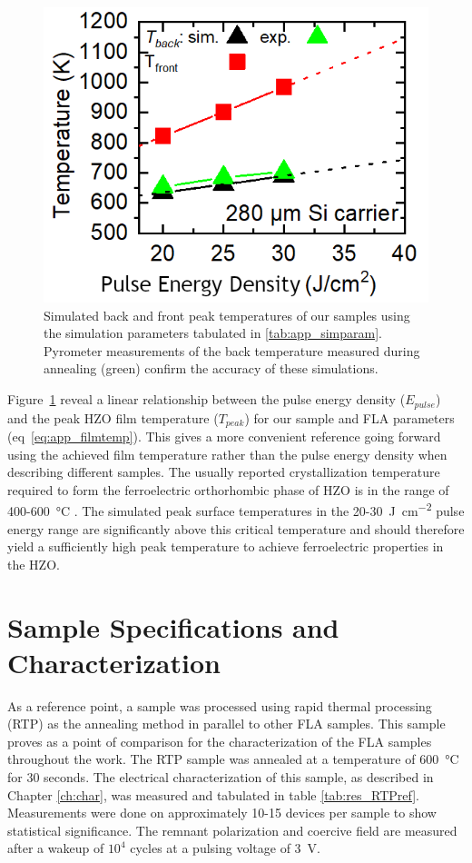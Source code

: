 \documentclass[11pt,twoside,final]{eitExjobb}  %
\begin{document}
\begin{figure}[htbp]
    \centering
    \includegraphics[width=.41\linewidth]{fig/img/COMSOLFlashInt.png}
    \caption{Simulated back and front peak temperatures of our samples using the
    simulation parameters tabulated in \ref{tab:app_simparam}. Pyrometer
    measurements of the back temperature measured during annealing (green) confirm
    the accuracy of these simulations.}\label{fig:res_Comsol}
\end{figure}

Figure~\ref{fig:res_Comsol} reveal a linear relationship between the pulse
energy density ($E_{pulse}$) and the peak HZO film temperature ($T_{peak}$) for our
sample and FLA parameters (eq~\ref{eq:app_filmtemp}). This gives a more
convenient reference going forward using the achieved film temperature rather
than the pulse energy density when describing different samples. The usually reported
crystallization temperature required to form the ferroelectric orthorhombic
phase of HZO is in the range of 400-\SI{600}{\celsius}
\cite{muller2012ferroelectricity, athle2022improved}.
The simulated peak surface temperatures in the
20-\SI{30}{\joule\per\square\centi\meter} pulse energy range are significantly
above this critical temperature and should therefore yield a sufficiently high
peak temperature to achieve ferroelectric properties in the HZO.

\section{Sample Specifications and Characterization}
As a reference point, a sample was processed using rapid thermal processing
(RTP) as the annealing method in parallel to other FLA samples. This sample
proves as a point of comparison for the characterization of the FLA samples
throughout the work. The RTP sample was annealed at a temperature of
\SI{600}{\celsius} for 30 seconds. The electrical characterization of this
sample, as described in Chapter \ref{ch:char}, was measured and
tabulated in table \ref{tab:res_RTPref}. Measurements were done on approximately
10-15 devices per sample to show statistical significance. The remnant
polarization and coercive field are measured after a wakeup of $10^4$ cycles at
a pulsing voltage of \SI{3}{\volt}.
\end{document}
